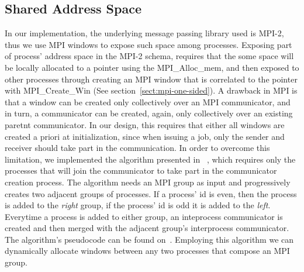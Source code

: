 \subsection{Shared Address Space}
In our implementation, the underlying message passing library used is MPI-2, thus we use MPI windows to
expose such space among processes.  
Exposing part of process' address space in the MPI-2 schema, requires that the some
space will be locally allocated to a pointer using the MPI\_Alloc\_mem, and then exposed to other processes
through creating an MPI window that is correlated to the pointer with MPI\_Create\_Win 
(See section~\ref{sect:mpi-one-sided}). 
A drawback in MPI is that a window can be created only collectively over an MPI communicator,
and in turn, a communicator can be created, again, only collectively over an existing paretnt communicator. 
In our design, this requires that either all windows are created a priori at initialization, 
since when issuing a job, only the sender and receiver should take part in the communication.  
In order to overcome this limitation, we implemented the algorithm presented in
~\cite{Dinan:2011:NCC:2042476.2042508}, which requires only the processes that will join the communicator to
take part in the communicator creation process.  The algorithm needs an MPI group as input and progressively
creates two adjacent groups of processes.  If a process' id is even, then the process is added to the \emph{right}
group, if the process' id is odd it is added to the \emph{left}.  Everytime a process is added to either group, an
inteprocess communicator is created and then merged with the adjacent group's interprocess communicator. The 
algorithm's pseudocode can be found on~\cite[p.287~]{Dinan:2011:NCC:2042476.2042508}.
Employing this algorithm we can dynamically allocate windows between any two processes that compose an MPI group.

